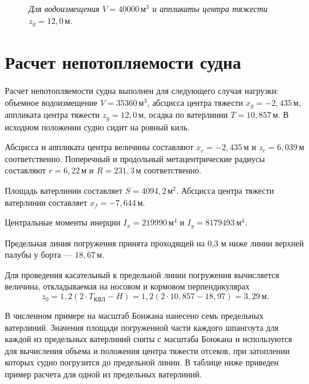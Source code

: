 \begin{figure}[H]
    \centerline{}
    \caption{Диаграмма статической и динамической остойчивости}
    \caption*{\textit{
        Для водоизмещения $V = 40000\,\text{м}^3$ и аппликаты центра тяжести $z_g = 12{,}0\,\text{м}$.
    }}
\end{figure}

\section{Расчет непотопляемости судна}

Расчет непотопляемости судна выполнен для следующего случая нагрузки: объемное водоизмещение $V = 35360\,\text{м}^3$, абсцисса центра тяжести $x_g = -2{,}435\,\text{м}$, аппликата центра тяжести $z_g = 12{,}0\,\text{м}$, осадка по ватерлинии $T = 10{,}857\,\text{м}$.
В исходном положении судно сидит на ровный киль.

Абсцисса и аппликата центра величины составляют $x_c = -2{,}435\,\text{м}$ и $z_c = 6{,}039\,\text{м}$ соответственно.
Поперечный и продольный метацентрические радиусы составляют $r = 6{,}22\,\text{м}$ и $R = 231{,}3\,\text{м}$ соответственно.

Площадь ватерлинии составляет $S = 4094{,}2\,\text{м}^2$.
Абсцисса центра тяжести ватерлинии составляет $x_f = -7{,}644\,\text{м}$.

Центральные моменты инерции $I_x = 219990\,\text{м}^4$ и $I_y = 8179493\,\text{м}^4$.

Предельная линия погружения принята проходящей на 0,3 м ниже линии верхней палубы у борта --- $18{,}67\,\text{м}$.

Для проведения касательный к предельной линии погружения вычисляется величина, откладываемая на носовом и кормовом перпендикулярах
\begin{equation*}
    z_0 = 1{,}2 (2 \cdot T_{\text{КВЛ}} - H) = 1{,}2 (2 \cdot 10{,}857 - 18{,}97) = 3{,}29\,\text{м}.
\end{equation*}

В численном примере на масштаб Бонжана нанесено семь предельных ватерлиний.
Значения площади погруженной части каждого шпангоута для каждой из предельных ватерлиний сняты с масштаба Бонжана и используются для вычисления объема и положения центра тяжести отсеков, при затоплении которых судно погрузится до предельной линии.
В таблице ниже приведен пример расчета для одной из предельных ватерлиний.

